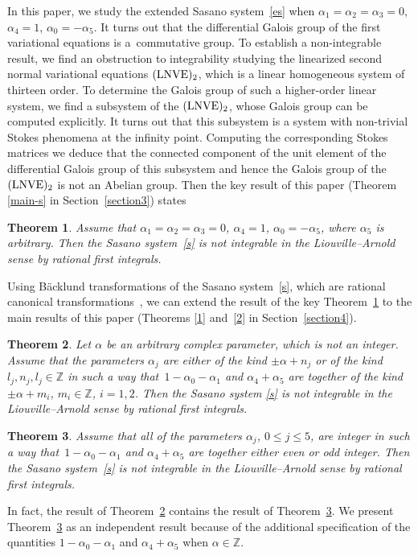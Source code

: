 \documentclass[pdftex]{sigma}
\numberwithin{equation}{section}
\newtheorem{Theorem}{Theorem}[section]
\begin{document}
 In this paper, we study the extended Sasano system~\eqref{es} when $\alpha_1=\alpha_2=\alpha_3=0$, ${\alpha_4=1}$, ${\alpha_0=-\alpha_5}$.
 It turns out that the differential Galois group of the first
 variational equations is a~commutative group.
 To establish a non-integrable result, we find an obstruction to integrability studying the linearized second normal variational equations
 $({\rm LNVE})_2$, which is a linear homogeneous system of thirteen order. To determine the Galois group of such a higher-order linear system, we find
 a subsystem of the $({\rm LNVE})_2$, whose Galois group can be computed explicitly.
 It turns out that this subsystem is a system with non-trivial Stokes phenomena at the infinity point. Computing the corresponding
 Stokes matrices we deduce that the connected component of the unit element of the differential Galois group
 of this subsystem and hence the Galois group of the $({\rm LNVE})_2$ is not an Abelian group. Then
 the key result of this paper (Theorem \ref{main-s} in Section~\ref{section3}) states

 \begin{Theorem}\label{key}
 Assume that $\alpha_1=\alpha_2=\alpha_3=0$, $\alpha_4=1$, $\alpha_0=-\alpha_5$, where $\alpha_5$ is arbitrary. Then the
 Sasano system~\eqref{s} is not integrable in the Liouville--Arnold sense by rational first integrals.
 \end{Theorem}

 Using B\"{a}cklund transformations of the Sasano system~\eqref{s}, which are rational canonical transformations~\cite{SY}, we can extend the result of the key Theorem~\ref{key} to
 the main results of this paper (Theorems \ref{1} and~\ref{2} in Section~\ref{section4}).
 \begin{Theorem}\label{main}
 Let $\alpha$ be an arbitrary complex parameter, which is not an integer. Assume that the parameters $\alpha_j$ are either of the kind
 $\pm \alpha + n_j$ or of the kind $l_j, n_j, l_j\in\mathbb{Z}$ in such a way that~${1-\alpha_0-\alpha_1}$ and
 $\alpha_4+\alpha_5$ are together of the kind $\pm \alpha + m_i$, $m_i\in\mathbb{Z}$, $i=1, 2$. Then the Sasano system
 \eqref{s} is not integrable in the Liouville--Arnold sense by rational first integrals.
 \end{Theorem}

 \begin{Theorem}\label{main0}
 Assume that all of the parameters $\alpha_j$, $0 \leq j \leq 5$, are integer in such a way that~$1-\alpha_0-\alpha_1$
 and $\alpha_4+\alpha_5$ are together either even or odd integer. Then the Sasano system~\eqref{s}
 is not integrable in the Liouville--Arnold sense by rational first integrals.
 \end{Theorem}
 In fact, the result of Theorem~\ref{main} contains the result of Theorem~\ref{main0}. We present Theorem~\ref{main0} as an independent
 result because of the additional specification of the quantities $1-\alpha_0-\alpha_1$ and $\alpha_4+\alpha_5$ when $\alpha\in\mathbb{Z}$.
\end{document}
